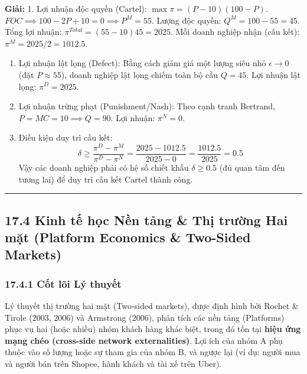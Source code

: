 \documentclass[
]{article}
\begin{document}
\textbf{Giải:} 1. Lợi nhuận độc quyền (Cartel):
\(\max \pi = (P - 10)(100 - P)\).
\(FOC \implies 100 - 2P + 10 = 0 \implies P^M = 55\). Lượng độc quyền:
\(Q^M = 100 - 55 = 45\). Tổng lợi nhuận:
\(\pi^{Total} = (55 - 10)45 = 2025\). Mỗi doanh nghiệp nhận (cấu kết):
\(\pi^M = 2025 / 2 = 1012.5\).

\begin{enumerate}
\def\labelenumi{\arabic{enumi}.}
\setcounter{enumi}{1}
\item
  Lợi nhuận lật lọng (Defect): Bằng cách giảm giá một lượng siêu nhỏ
  \(\epsilon \to 0\) (đặt \(P \approx 55\)), doanh nghiệp lật lọng chiếm
  toàn bộ cầu \(Q = 45\). Lợi nhuận lật lọng: \(\pi^D = 2025\).
\item
  Lợi nhuận trừng phạt (Punishment/Nash): Theo cạnh tranh Bertrand,
  \(P = MC = 10 \implies Q = 90\). Lợi nhuận: \(\pi^N = 0\).
\item
  Điều kiện duy trì cấu kết:
  \[ \delta \ge \frac{\pi^D - \pi^M}{\pi^D - \pi^N} = \frac{2025 - 1012.5}{2025 - 0} = \frac{1012.5}{2025} = 0.5 \]
  Vậy các doanh nghiệp phải có hệ số chiết khấu \(\delta \ge 0.5\) (đủ
  quan tâm đến tương lai) để duy trì cấu kết Cartel thành công.
\end{enumerate}

\begin{center}\rule{0.5\linewidth}{0.5pt}\end{center}

\subsection{17.4 Kinh tế học Nền tảng \& Thị trường Hai mặt (Platform
Economics \& Two-Sided
Markets)}\label{kinh-tux1ebf-hux1ecdc-nux1ec1n-tux1ea3ng-thux1ecb-trux1b0ux1eddng-hai-mux1eb7t-platform-economics-two-sided-markets}

\subsubsection{17.4.1 Cốt lõi Lý
thuyết}\label{cux1ed1t-luxf5i-luxfd-thuyux1ebft-3}

Lý thuyết thị trường hai mặt (Two-sided markets), được định hình bởi
Rochet \& Tirole (2003, 2006) và Armstrong (2006), phân tích các nền
tảng (Platforms) phục vụ hai (hoặc nhiều) nhóm khách hàng khác biệt,
trong đó tồn tại \textbf{hiệu ứng mạng chéo (cross-side network
externalities)}. Lợi ích của nhóm A phụ thuộc vào số lượng hoặc sự tham
gia của nhóm B, và ngược lại (ví dụ: người mua và người bán trên Shopee,
hành khách và tài xế trên Uber).
\end{document}
